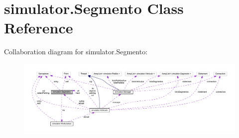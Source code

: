 \hypertarget{classsimulator_1_1_segmento}{}\section{simulator.\+Segmento Class Reference}
\label{classsimulator_1_1_segmento}


Collaboration diagram for simulator.\+Segmento\+:\nopagebreak
\begin{figure}[H]
\begin{center}
\leavevmode
\includegraphics[width=350pt]{classsimulator_1_1_segmento__coll__graph}
\end{center}
\end{figure}
